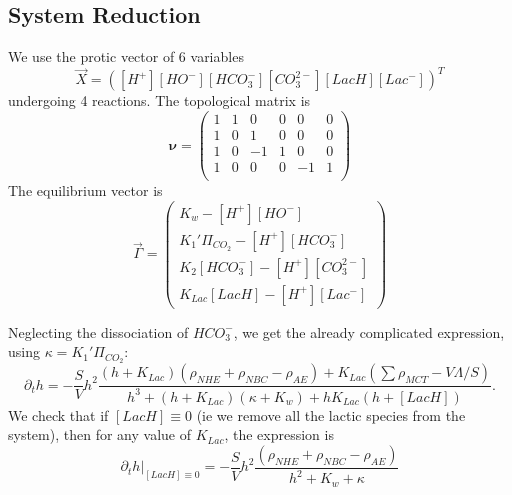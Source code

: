\documentclass{revtex4}
\begin{document}
\subsection{System Reduction}
We use the protic vector of 6 variables
\begin{equation}
	\vec{X} = \left( \left[H^+\right]  \left[HO^-\right] \left[HCO_3^-\right] \left[CO_3^{2-}\right] \left[LacH\right]  \left[Lac^-\right] \right)^T
\end{equation}
undergoing 4 reactions.
The topological matrix is
\begin{equation}
	\boldsymbol{\nu} =
	\begin{pmatrix}
	1 & 1 & 0 & 0 & 0 & 0\\
	1 & 0 & 1 & 0 & 0 & 0\\
	1 & 0 & -1 & 1 & 0 & 0\\
	1 & 0 & 0 & 0  & -1 & 1\\
	\end{pmatrix}
\end{equation}
The equilibrium vector is
\begin{equation}
	\vec{\Gamma} =
	 \begin{pmatrix}
	K_w - \left[H^+\right]  \left[HO^-\right]\\
	K_1'\Pi_{CO_2} - \left[H^+\right]\left[HCO_3^-\right]\\
	K_2 {\left[HCO_3^-\right]} -\left[H^+\right]\left[CO_3^{2-}\right]\\
	K_{Lac}\left[LacH\right] - \left[H^+\right]\left[Lac^-\right]
	\end{pmatrix}
\end{equation}

Neglecting the dissociation of $HCO_3^-$, we get the already complicated expression, using $\kappa = K_1'\Pi_{CO_2}$:
\begin{equation}
\partial_t h = - \dfrac{S}{V} h^2
\dfrac{\left(h+K_{Lac}\right)\left(\rho_{NHE}+\rho_{NBC}-\rho_{AE}\right)+K_{Lac}\left(\sum \rho_{MCT}-V\Lambda/S\right)}
{h^3+(h+K_{Lac})\left(\kappa+K_w\right)+h K_{Lac}\left(h+\left[LacH\right]\right)}.
\end{equation}
We check that if $\left[LacH\right]\equiv0$ (ie we remove all the lactic species from the system), then for any value of $K_{Lac}$, the expression is
$$
	\partial_t h\vert_{\left[LacH\right]\equiv0} = 
	-\dfrac{S}{V} h^2
	\dfrac{\left(\rho_{NHE}+\rho_{NBC}-\rho_{AE}\right)}{h^2+K_w+\kappa}
$$
\end{document}
